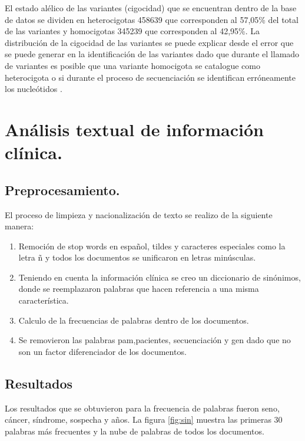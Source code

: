 El estado alélico de las variantes (cigocidad) que se encuentran dentro de la base de datos se dividen en heterocigotas 458639 que corresponden al 57,05\% del total de las variantes  y homocigotas 345239 que corresponden al 42,95\%. La distribución de la cigocidad de las variantes se puede explicar desde el error que se puede generar en la identificación de las variantes dado que durante el llamado  de variantes es posible que una variante homocigota se catalogue como heterocigota o si durante el proceso de secuenciación se identifican erróneamente los nucleótidos \cite{Babraham2016}\cite{Pirooznia2014}. 


\section{Análisis textual de información clínica.}

 
\subsection{Preprocesamiento.}

El proceso de limpieza y nacionalización de texto se realizo de la siguiente manera:

 \begin{enumerate}
 	\item Remoción de stop words en español, tildes y caracteres especiales como  la letra ñ y todos los documentos se unificaron en letras minúsculas.
 	\item Teniendo en cuenta la información clínica se creo un diccionario de sinónimos, donde se reemplazaron palabras que hacen referencia a una misma característica.
 	\item Calculo de la frecuencias de palabras dentro de los documentos. 
 	\item Se removieron las palabras pam,pacientes, secuenciación y gen dado que no son un factor diferenciador de los documentos.  	  
 \end{enumerate}

\subsection*{Resultados}

Los resultados que se obtuvieron para la frecuencia de palabras fueron seno, cáncer, síndrome, sospecha y años. La figura \ref{fig:sin} muestra las primeras 30 palabras más frecuentes y la nube de palabras de todos los documentos.\\


